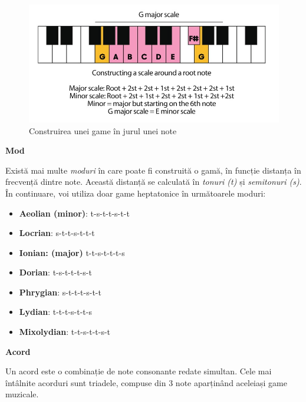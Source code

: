 \begin{figure}[H]
    \centering
    \includegraphics[scale=0.45]{images/scale.jpeg}
    \caption{Construirea unei game în jurul unei note}
    \label{image.scale}
\end{figure}

\noindent \textbf{Mod} \par
\noindent Există mai multe \textit{moduri} în care poate fi construită o gamă, în funcție distanța în frecvență dintre note. Această distanță se calculată în \textit{tonuri (t)} și \textit{semitonuri (s)}. În continuare, voi utiliza doar game heptatonice în următoarele moduri:

\begin{itemize}[topsep=0pt,itemsep=0pt,parsep=0pt,partopsep=0pt]
    \item \textbf{Aeolian (minor)}: t-s-t-t-s-t-t
    \item \textbf{Locrian}: s-t-t-s-t-t-t
    \item \textbf{Ionian: (major)} t-t-s-t-t-t-s
    \item \textbf{Dorian}: t-s-t-t-t-s-t
    \item \textbf{Phrygian}: s-t-t-t-s-t-t
    \item \textbf{Lydian}: t-t-t-s-t-t-s
    \item \textbf{Mixolydian}: t-t-s-t-t-s-t
\end{itemize}

\noindent \textbf{Acord} \par
\noindent Un acord este o combinație de note consonante redate simultan. Cele mai întâlnite acorduri sunt triadele, compuse din 3 note aparținând aceleiași game muzicale.  \par

